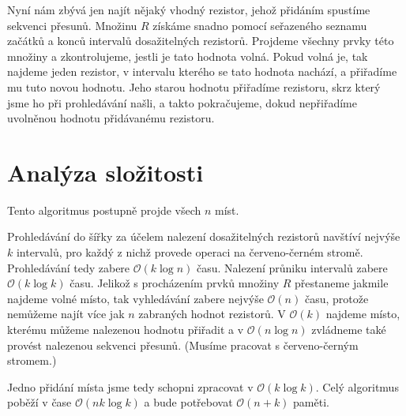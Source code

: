 \documentclass{article}
\begin{document}
Nyní nám zbývá jen najít nějaký vhodný rezistor, jehož přidáním spustíme sekvenci přesunů. Množinu $R$ získáme snadno pomocí seřazeného seznamu začátků a konců intervalů dosažitelných rezistorů. Projdeme všechny prvky této množiny a zkontrolujeme, jestli je tato hodnota volná. Pokud volná je, tak najdeme jeden rezistor, v intervalu kterého se tato hodnota nachází, a přiřadíme mu tuto novou hodnotu. Jeho starou hodnotu přiřadíme rezistoru, skrz který jsme ho při prohledávání našli, a takto pokračujeme, dokud nepřiřadíme uvolněnou hodnotu přidávanému rezistoru.

\section{Analýza složitosti}

Tento algoritmus postupně projde všech $n$ míst.

Prohledávání do šířky za účelem nalezení dosažitelných rezistorů navštíví nejvýše $k$ intervalů, pro každý z nichž provede operaci na červeno-černém stromě. Prohledávání tedy zabere $\mathcal{O}(k \log n)$ času. Nalezení průniku intervalů zabere $\mathcal{O}(k \log k)$ času. Jelikož s procházením prvků množiny $R$ přestaneme jakmile najdeme volné místo, tak vyhledávání zabere nejvýše $\mathcal{O}(n)$ času, protože nemůžeme najít více jak $n$ zabraných hodnot rezistorů. V $\mathcal{O}(k)$ najdeme místo, kterému můžeme nalezenou hodnotu přiřadit a v $\mathcal{O}(n \log n)$ zvládneme také provést nalezenou sekvenci přesunů. (Musíme pracovat s červeno-černým stromem.)

Jedno přidání místa jsme tedy schopni zpracovat v $\mathcal{O}(k \log k)$. Celý algoritmus poběží v čase $\mathcal{O}(nk \log k)$ a bude potřebovat $\mathcal{O}(n + k)$ paměti.
\end{document}
